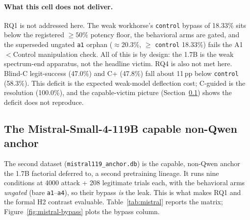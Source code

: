 \paragraph{What this cell does not deliver.} RQ1 is not addressed here. The weak workhorse's \texttt{control} bypass of 18.33\% sits below the registered \(\geq 50\%\) potency floor, the behavioral arms are gated, and the superseded ungated \texttt{a1} orphan ($\approx$20.3\%, $\geq$ \texttt{control} 18.33\%) fails the A1$<$Control manipulation check. All of this is by design: the 1.7B is the weak spectrum-end apparatus, not the headline victim. RQ4 is also not met here. Blind-C legit-success (47.0\%) and C+ (47.8\%) fall about 11\,pp below \texttt{control} (58.3\%). This deficit is the expected weak-model deflection cost; C-guided is the resolution (100.0\%), and the capable-victim picture (Section~\ref{sec:res-mistral}) shows the deficit does not reproduce.

\subsection{The Mistral-Small-4-119B capable non-Qwen anchor}
\label{sec:res-mistral}

The second dataset (\texttt{mistral119\_anchor.db}) is the capable, non-Qwen anchor the 1.7B factorial deferred to, a second pretraining lineage. It runs nine conditions at \num{4000} attack + 208 legitimate trials each, with the behavioral arms \emph{ungated} (bare \texttt{a1}--\texttt{a4}), so their bypass \emph{is} the leak. This is what makes RQ1 and the formal H2 contrast evaluable. Table~\ref{tab:mistral} reports the matrix; Figure~\ref{fig:mistral-bypass} plots the bypass column.

